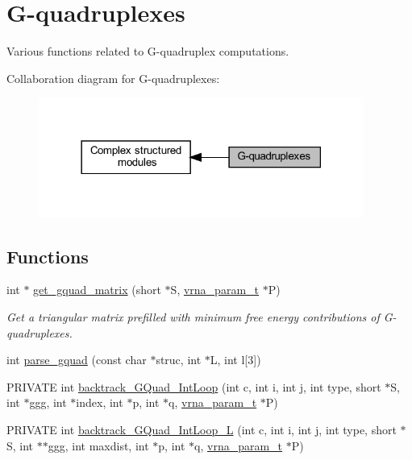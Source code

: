 \hypertarget{group__gquads}{}\section{G-\/quadruplexes}
\label{group__gquads}


Various functions related to G-\/quadruplex computations.  


Collaboration diagram for G-\/quadruplexes\+:
\nopagebreak
\begin{figure}[H]
\begin{center}
\leavevmode
\includegraphics[width=302pt]{group__gquads}
\end{center}
\end{figure}
\subsection*{Functions}
\begin{DoxyCompactItemize}
\item 
int $\ast$ \hyperlink{group__gquads_ga392e45c9615aa123737671603fa4203c}{get\+\_\+gquad\+\_\+matrix} (short $\ast$S, \hyperlink{group__energy__parameters_ga8a69ca7d787e4fd6079914f5343a1f35}{vrna\+\_\+param\+\_\+t} $\ast$P)
\begin{DoxyCompactList}\small\item\em Get a triangular matrix prefilled with minimum free energy contributions of G-\/quadruplexes. \end{DoxyCompactList}\item 
int \hyperlink{group__gquads_gae41763215b9c64d2a7b67f0df8a28078}{parse\+\_\+gquad} (const char $\ast$struc, int $\ast$L, int l\mbox{[}3\mbox{]})
\item 
P\+R\+I\+V\+A\+TE int \hyperlink{group__gquads_ga220c41e8dbcee940ac975b8ce88e55c5}{backtrack\+\_\+\+G\+Quad\+\_\+\+Int\+Loop} (int c, int i, int j, int type, short $\ast$S, int $\ast$ggg, int $\ast$index, int $\ast$p, int $\ast$q, \hyperlink{group__energy__parameters_ga8a69ca7d787e4fd6079914f5343a1f35}{vrna\+\_\+param\+\_\+t} $\ast$P)
\item 
P\+R\+I\+V\+A\+TE int \hyperlink{group__gquads_ga7b371308fa5a45c7ac353ef6ed1014de}{backtrack\+\_\+\+G\+Quad\+\_\+\+Int\+Loop\+\_\+L} (int c, int i, int j, int type, short $\ast$S, int $\ast$$\ast$ggg, int maxdist, int $\ast$p, int $\ast$q, \hyperlink{group__energy__parameters_ga8a69ca7d787e4fd6079914f5343a1f35}{vrna\+\_\+param\+\_\+t} $\ast$P)
\end{DoxyCompactItemize}


